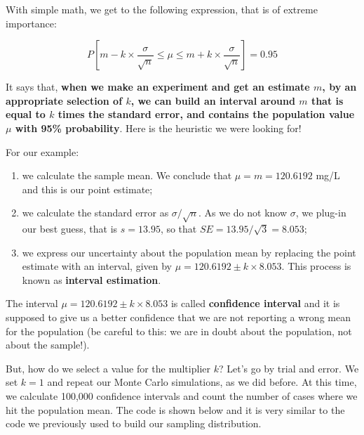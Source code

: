 \documentclass[a4paper,12pt,oneside]{book}
\providecommand{\tightlist}{%
  \setlength{\itemsep}{0pt}\setlength{\parskip}{0pt}}
\begin{document}
With simple math, we get to the following expression, that is of extreme importance:

\[P \left[ m - k \times \frac{\sigma}{\sqrt{n} } \leq \mu \leq m + k \times \frac{\sigma}{\sqrt{n} } \right] = 0.95\]

It says that, \textbf{when we make an experiment and get an estimate \(m\), by an appropriate selection of \(k\), we can build an interval around \(m\) that is equal to \(k\) times the standard error, and contains the population value \(\mu\) with 95\% probability}. Here is the heuristic we were looking for!

For our example:

\begin{enumerate}
\def\labelenumi{\arabic{enumi}.}
\tightlist
\item
  we calculate the sample mean. We conclude that \(\mu = m = 120.6192\) mg/L and this is our point estimate;
\item
  we calculate the standard error as \(\sigma/\sqrt{n}\). As we do not know \(\sigma\), we plug-in our best guess, that is \(s = 13.95\), so that \(SE = 13.95 / \sqrt{3} = 8.053\);
\item
  we express our uncertainty about the population mean by replacing the point estimate with an interval, given by \(\mu = 120.6192 \pm k \times 8.053\). This process is known as \textbf{interval estimation}.
\end{enumerate}

The interval \(\mu = 120.6192 \pm k \times 8.053\) is called \textbf{confidence interval} and it is supposed to give us a better confidence that we are not reporting a wrong mean for the population (be careful to this: we are in doubt about the population, not about the sample!).

But, how do we select a value for the multiplier \(k\)? Let's go by trial and error. We set \(k = 1\) and repeat our Monte Carlo simulations, as we did before. At this time, we calculate 100,000 confidence intervals and count the number of cases where we hit the population mean. The code is shown below and it is very similar to the code we previously used to build our sampling distribution.
\end{document}
